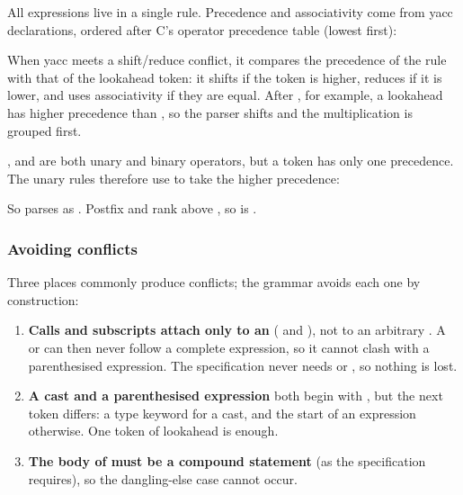 \documentclass[12pt]{article}
\begin{document}
All expressions live in a single  rule. Precedence and associativity come from yacc
declarations, ordered after C's operator precedence table (lowest first):


When yacc meets a shift/reduce conflict, it compares the precedence of the rule with that of the
lookahead token: it shifts if the token is higher, reduces if it is lower, and uses associativity if
they are equal. After , for example, a lookahead \code{*} has higher precedence than \code{-},
so the parser shifts and the multiplication is grouped first.

\code{-}, \code{*} and \code{&} are both unary and binary operators, but a token has only one
precedence. The unary rules therefore use  to take the higher precedence:


So  parses as . Postfix \code{++} and \code{--} rank above , so
 is .

\subsubsection{Avoiding conflicts}

Three places commonly produce conflicts; the grammar avoids each one by construction:

\begin{enumerate}
  \item \textbf{Calls and subscripts attach only to an } ( and ),
        not to an arbitrary . A \code{(} or \code{[} can then never follow a complete expression,
        so it cannot clash with a parenthesised expression. The specification never needs  or
        , so nothing is lost.
  \item \textbf{A cast and a parenthesised expression} both begin with \code{(}, but the next token differs: a
        type keyword for a cast, and the start of an expression otherwise. One token of lookahead is enough.
  \item \textbf{The body of  must be a compound statement} (as the specification requires), so the
        dangling-else case  cannot occur.
\end{enumerate}
\end{document}

